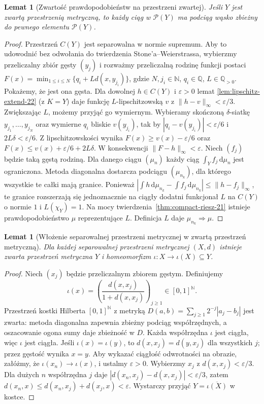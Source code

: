 \documentclass[11pt,a4paper,oneside]{book}
\numberwithin{equation}{chapter}
\theoremstyle{plain}
\newtheorem{lemat}[twierdzenie]{Lemat}
\theoremstyle{definition}
\theoremstyle{remark}
\begin{document}
\begin{lemat}[Zwartość prawdopodobieństw na przestrzeni zwartej]
\label{lem:compact-prob-22}
Jeśli $Y$ jest zwartą przestrzenią metryczną,
to każdy ciąg w $\mathcal P(Y)$ ma podciąg wąsko
zbieżny do pewnego elementu $\mathcal P(Y)$.
\end{lemat}
\begin{proof}
Przestrzeń $C(Y)$ jest separowalna w normie supremum.
Aby to udowodnić bez odwołania do twierdzenia
Stone'a--Weierstrassa, wybierzmy przeliczalny zbiór
gęsty $(y_j)$ i rozważmy przeliczalną rodzinę
funkcji postaci
$F(x)=\min_{1\le i\le N}\{q_i+L d(x,y_{j_i})\}$,
gdzie $N,j_i\in\mathbb N$, $q_i\in\mathbb Q$,
$L\in\mathbb Q_{>0}$.
Pokażemy, że jest ona gęsta. Dla dowolnej
$h\in C(Y)$ i $\varepsilon>0$ lemat
\ref{lem:lipschitz-extend-22} (z $K=Y$) daje
funkcję $L$-lipschitzowską $v$ z
$\|h-v\|_\infty<\varepsilon/3$.
Zwiększając $L$, możemy przyjąć go wymiernym.
Wybieramy skończoną $\delta$-siatkę
$y_{j_1},\ldots,y_{j_N}$ oraz wymierne $q_i$
bliskie $v(y_{j_i})$, tak by
$|q_i-v(y_{j_i})|<\varepsilon/6$ i
$2L\delta<\varepsilon/6$.
Z lipschitzowskości wynika
$F(x)\ge v(x)-\varepsilon/6$ oraz
$F(x)\le v(x)+\varepsilon/6+2L\delta$.
W konsekwencji $\|F-h\|_\infty<\varepsilon$.
Niech $(f_j)$ będzie taką gęstą
rodziną. Dla danego ciągu $(\mu_n)$ każdy ciąg
$\int_Y f_j\,\mathrm d\mu_n$ jest ograniczona.
Metoda diagonalna dostarcza podciągu $(\mu_{n_k})$,
dla którego wszystkie te całki mają granice.
Ponieważ
$|\int h\,\mathrm d\mu_{n_k}-\int f_j\,\mathrm d\mu_{n_k}|
\le\|h-f_j\|_\infty$, te granice rozszerzają się
jednoznacznie na ciągły dodatni funkcjonał $L$ na
$C(Y)$ o normie $1$ i $L(\chi_Y)=1$.
Na mocy twierdzenia~\ref{thm:compact-riesz-21}
istnieje prawdopodobieństwo $\mu$ reprezentujące $L$.
Definicja $L$ daje $\mu_{n_k}\Rightarrow\mu$.
\end{proof}

\begin{lemat}[Włożenie separowalnej przestrzeni metrycznej
w zwartą przestrzeń metryczną]
\label{lem:hilbert-cube-22}
Dla każdej separowalnej przestrzeni metrycznej $(X,d)$
istnieje zwarta przestrzeń metryczna $Y$ i homeomorfizm
$\iota:X\to\iota(X)\subseteq Y$.
\end{lemat}
\begin{proof}
Niech $(x_j)$ będzie przeliczalnym zbiorem gęstym.
Definiujemy
\[
\iota(x)=\left(\frac{d(x,x_j)}{1+d(x,x_j)}\right)_{j\ge1}
\in[0,1]^{\mathbb N}.
\]
Przestrzeń kostki Hilberta $[0,1]^{\mathbb N}$ z metryką
$D(a,b)=\sum_{j\ge1}2^{-j}|a_j-b_j|$ jest zwarta:
metoda diagonalna zapewnia zbieżny podciąg współrzędnych,
a oszacowanie ogona sumy daje zbieżność w $D$.
Każda współrzędna $\iota$ jest ciągła, więc
$\iota$ jest ciągła. Jeśli $\iota(x)=\iota(y)$,
to $d(x,x_j)=d(y,x_j)$ dla wszystkich $j$;
przez gęstość wynika $x=y$.
Aby wykazać ciągłość odwrotności na obrazie, załóżmy,
że $\iota(x_n)\to\iota(x)$, i ustalmy $\varepsilon>0$.
Wybierzmy $x_j$ z $d(x,x_j)<\varepsilon/3$.
Dla dużych $n$ współrzędna $j$ daje
$|d(x_n,x_j)-d(x,x_j)|<\varepsilon/3$,
zatem $d(x_n,x)\le d(x_n,x_j)+d(x_j,x)<\varepsilon$.
Wystarczy przyjąć $Y=\overline{\iota(X)}$ w kostce.
\end{proof}
\end{document}

